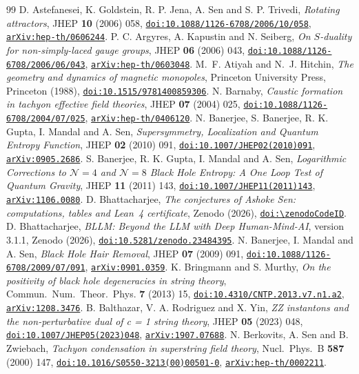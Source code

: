 \begin{thebibliography}{99}
\providecommand{\doilink}[1]{\href{https://doi.org/#1}{\nolinkurl{doi:#1}}}
\providecommand{\arxivlink}[1]{\href{https://arxiv.org/abs/#1}{\nolinkurl{arXiv:#1}}}
 D. Astefanesei, K. Goldstein, R. P. Jena, A. Sen and S. P. Trivedi, \emph{Rotating attractors}, JHEP \textbf{10} (2006) 058, \doilink{10.1088/1126-6708/2006/10/058}, \arxivlink{hep-th/0606244}.
 P. C. Argyres, A. Kapustin and N. Seiberg, \emph{On $S$-duality for non-simply-laced gauge groups}, JHEP \textbf{06} (2006) 043, \doilink{10.1088/1126-6708/2006/06/043}, \arxivlink{hep-th/0603048}.
 M.~F. Atiyah and N.~J. Hitchin, \emph{The geometry and dynamics of magnetic monopoles}, Princeton University Press, Princeton (1988), \doilink{10.1515/9781400859306}.
 N. Barnaby, \emph{Caustic formation in tachyon effective field theories}, JHEP \textbf{07} (2004) 025, \doilink{10.1088/1126-6708/2004/07/025}, \arxivlink{hep-th/0406120}.
 N. Banerjee, S. Banerjee, R. K. Gupta, I. Mandal and A. Sen, \emph{Supersymmetry, Localization and Quantum Entropy Function}, JHEP \textbf{02} (2010) 091, \doilink{10.1007/JHEP02(2010)091}, \arxivlink{0905.2686}.
 S. Banerjee, R. K. Gupta, I. Mandal and A. Sen, \emph{Logarithmic Corrections to $\mathcal N=4$ and $\mathcal N=8$ Black Hole Entropy: A One Loop Test of Quantum Gravity}, JHEP \textbf{11} (2011) 143, \doilink{10.1007/JHEP11(2011)143}, \arxivlink{1106.0080}.
 D. Bhattacharjee, \emph{The conjectures of Ashoke Sen: computations, tables and Lean~4 certificate}, Zenodo (2026), \href{https://doi.org/\zenodoCodeID}{\nolinkurl{doi:\zenodoCodeID}}.
 D. Bhattacharjee, \emph{BLLM: Beyond the LLM with Deep Human-Mind-AI}, version 3.1.1, Zenodo (2026), \doilink{10.5281/zenodo.23484395}.
 N. Banerjee, I. Mandal and A. Sen, \emph{Black Hole Hair Removal}, JHEP \textbf{07} (2009) 091, \doilink{10.1088/1126-6708/2009/07/091}, \arxivlink{0901.0359}.
 K. Bringmann and S. Murthy, \emph{On the positivity of black hole degeneracies in string theory}, Commun.\ Num.\ Theor.\ Phys. \textbf{7} (2013) 15, \doilink{10.4310/CNTP.2013.v7.n1.a2}, \arxivlink{1208.3476}.
 B. Balthazar, V. A. Rodriguez and X. Yin, \emph{ZZ instantons and the non-perturbative dual of c = 1 string theory}, JHEP \textbf{05} (2023) 048, \doilink{10.1007/JHEP05(2023)048}, \arxivlink{1907.07688}.
 N. Berkovits, A. Sen and B. Zwiebach, \emph{Tachyon condensation in superstring field theory}, Nucl.\ Phys.\ B \textbf{587} (2000) 147, \doilink{10.1016/S0550-3213(00)00501-0}, \arxivlink{hep-th/0002211}.

\end{thebibliography}
